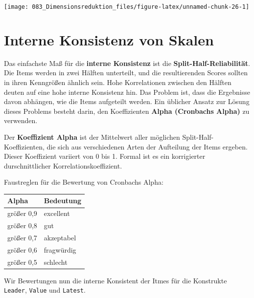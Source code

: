 \documentclass[12pt,]{book}
\begin{document}
\begin{center}\texttt{[image: 083\_Dimensionsreduktion\_files/figure-latex/unnamed-chunk-26-1]} \end{center}

\section{Interne Konsistenz von
Skalen}\label{interne-konsistenz-von-skalen}

Das einfachste Maß für die \textbf{interne Konsistenz} ist die
\textbf{Split-Half-Reliabilität}. Die Items werden in zwei Hälften
unterteilt, und die resultierenden Scores sollten in ihren Kenngrößen
ähnlich sein. Hohe Korrelationen zwischen den Hälften deuten auf eine
hohe interne Konsistenz hin. Das Problem ist, dass die Ergebnisse davon
abhängen, wie die Items aufgeteilt werden. Ein üblicher Ansatz zur
Lösung dieses Problems besteht darin, den Koeffizienten \textbf{Alpha
(Cronbachs Alpha)} zu verwenden.

Der \textbf{Koeffizient Alpha} ist der Mittelwert aller möglichen
Split-Half-Koeffizienten, die sich aus verschiedenen Arten der
Aufteilung der Items ergeben. Dieser Koeffizient variiert von 0 bis 1.
Formal ist es ein korrigierter durschnittlicher Korrelationskoeffizient.

Faustreglen für die Bewertung von Cronbachs Alpha:

\begin{longtable}[]{@{}ll@{}}
\toprule
Alpha & Bedeutung\tabularnewline
\midrule
\endhead
größer 0,9 & excellent\tabularnewline
größer 0,8 & gut\tabularnewline
größer 0,7 & akzeptabel\tabularnewline
größer 0,6 & fragwürdig\tabularnewline
größer 0,5 & schlecht\tabularnewline
\bottomrule
\end{longtable}

Wir Bewertungen nun die interne Konsistent der Itmes für die Konstrukte
\texttt{Leader}, \texttt{Value} und \texttt{Latest}.
\end{document}
